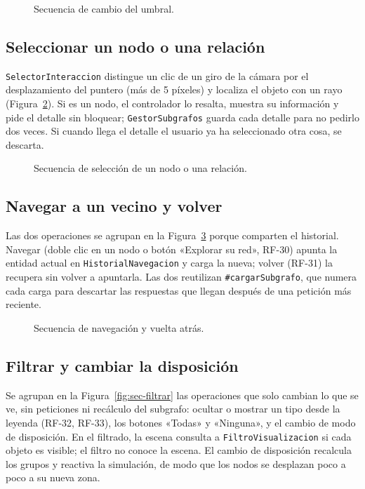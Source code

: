 \begin{figure}[htbp]
  \centering
  \caption{Secuencia de cambio del umbral.}
  \label{fig:sec-umbral}
\end{figure}

\subsection{Seleccionar un nodo o una relación}

\texttt{SelectorInteraccion} distingue un clic de un giro de la cámara por el desplazamiento del puntero (más de 5 píxeles) y localiza el objeto con un rayo (Figura~\ref{fig:sec-seleccionar}). Si es un nodo, el controlador lo resalta, muestra su información y pide el detalle sin bloquear; \texttt{GestorSubgrafos} guarda cada detalle para no pedirlo dos veces. Si cuando llega el detalle el usuario ya ha seleccionado otra cosa, se descarta.

\begin{figure}[htbp]
  \centering
  \caption{Secuencia de selección de un nodo o una relación.}
  \label{fig:sec-seleccionar}
\end{figure}

\subsection{Navegar a un vecino y volver}

Las dos operaciones se agrupan en la Figura~\ref{fig:sec-navegar} porque comparten el historial. Navegar (doble clic en un nodo o botón «Explorar su red», RF-30) apunta la entidad actual en \texttt{HistorialNavegacion} y carga la nueva; volver (RF-31) la recupera sin volver a apuntarla. Las dos reutilizan \texttt{\#cargarSubgrafo}, que numera cada carga para descartar las respuestas que llegan después de una petición más reciente.

\begin{figure}[htbp]
  \centering
  \caption{Secuencia de navegación y vuelta atrás.}
  \label{fig:sec-navegar}
\end{figure}

\subsection{Filtrar y cambiar la disposición}

Se agrupan en la Figura~\ref{fig:sec-filtrar} las operaciones que solo cambian lo que se ve, sin peticiones ni recálculo del subgrafo: ocultar o mostrar un tipo desde la leyenda (RF-32, RF-33), los botones «Todas» y «Ninguna», y el cambio de modo de disposición. En el filtrado, la escena consulta a \texttt{FiltroVisualizacion} si cada objeto es visible; el filtro no conoce la escena. El cambio de disposición recalcula los grupos y reactiva la simulación, de modo que los nodos se desplazan poco a poco a su nueva zona.

